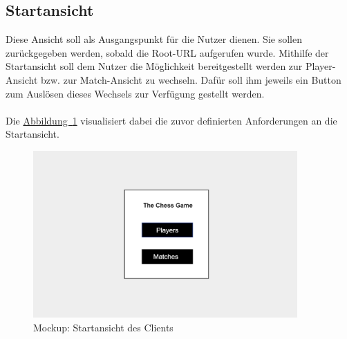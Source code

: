 \subsection{Startansicht}\label{sec:startView}
Diese Ansicht soll als Ausgangspunkt für die Nutzer dienen. Sie sollen zurückgegeben werden, sobald die Root-\gls{URL} aufgerufen wurde. Mithilfe der Startansicht soll dem Nutzer die Möglichkeit bereitgestellt werden zur Player-Ansicht bzw. zur Match-Ansicht zu wechseln. Dafür soll ihm jeweils ein Button zum Auslösen dieses Wechsels zur Verfügung gestellt werden.\\
\\
Die \hyperref[fig:startView]{Abbildung~\ref{fig:startView}} visualisiert dabei die zuvor definierten Anforderungen an die Startansicht.
\begin{figure}[htb]
	\includegraphics[width=0.9\textwidth]{images/start-view.png}
	\caption{Mockup: Startansicht des Clients}
	\label{fig:startView}
\end{figure}

